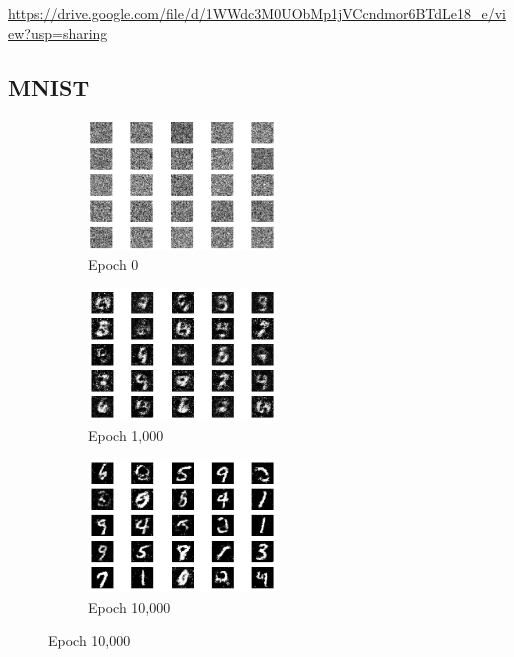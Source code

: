 \documentclass[a4paper]{article}    %
\begin{document}
\href{https://drive.google.com/file/d/1WWdc3M0UObMp1jVCcndmor6BTdLe18\_e/view?usp=sharing}{https://drive.google.com/file/d/1WWdc3M0UObMp1jVCcndmor6BTdLe18\_e/view?usp=sharing}

\subsection{MNIST}

\graphicspath{{../figures/Q9/mnist/}}

\begin{figure}[H]
    \centering
    \begin{subfigure}{0.32\textwidth}
        \centering
        \includegraphics[width=5cm]{0}
        \caption{Epoch 0}
        \label{fig:mnist-epoch0}
    \end{subfigure}
    \hfill
    \begin{subfigure}{0.32\textwidth}
        \centering
        \includegraphics[width=5cm]{1000}
        \caption{Epoch 1,000}
        \label{fig:mnist-epoch1000}
    \end{subfigure}
    \hfill
    \begin{subfigure}{0.32\textwidth}
        \centering
        \includegraphics[width=5cm]{10000}
        \caption{Epoch 10,000}
        \label{fig:mnist-epoch10000}
    \end{subfigure}

\end{figure}
\end{document}
